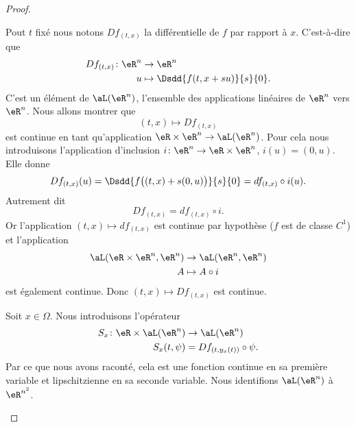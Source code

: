 \begin{proof}
	\begin{subproof}
		Pout \( t\) fixé nous notons \( Df_{(t,x)}\) la différentielle de \( f\) par rapport à \( x\). C'est-à-dire que
		\begin{equation}
			\begin{aligned}
				Df_{(t,x)}\colon \eR^n & \to \eR^n                         \\
				u                      & \mapsto \Dsdd{ f(t,x+su) }{s}{0}.
			\end{aligned}
		\end{equation}
		C'est un élément de \( \aL(\eR^n)\), l'ensemble des applications linéaires de \( \eR^n\) vers \( \eR^n\). Nous allons montrer que
		\begin{equation}
			(t,x)\mapsto Df_{(t,x)}
		\end{equation}
		est continue en tant qu'application \( \eR\times \eR^n\to\aL(\eR^n)\). Pour cela nous introduisons l'application d'inclusion \( i\colon \eR^n\to \eR\times \eR^n\), \( i(u)=(0,u)\). Elle donne
		\begin{equation}
			Df_{(t,x)}(u)=\Dsdd{ f\big( (t,x)+s(0,u) \big) }{s}{0}=df_{(t,x)}\circ i (u).
		\end{equation}
		Autrement dit
		\begin{equation}
			Df_{(t,x)}=df_{(t,x)}\circ i.
		\end{equation}
		Or l'application \( (t,x)\mapsto df_{(t,x)} \) est continue par hypothèse (\( f\) est de classe \( C^1\)) et l'application
		\begin{equation}        \label{EQooZTAPooCduWcl}
			\begin{aligned}
				\aL(\eR\times \eR^n,\eR^n) & \to \aL(\eR^n,\eR^n) \\
				A                          & \mapsto A\circ i
			\end{aligned}
		\end{equation}
		est également continue. Donc \( (t,x)\mapsto Df_{(t,x)}\) est continue.


		Soit \( x\in \Omega\). Nous introduisons l'opérateur
		\begin{equation}
			\begin{aligned}
				S_x\colon \eR\times \aL(\eR^n) & \to \aL(\eR^n)              \\
				S_x(t,\psi)                    & =Df_{(t,y_x(t))}\circ \psi.
			\end{aligned}
		\end{equation}
		Par ce que nous avons raconté, cela est une fonction continue en sa première variable et lipschitzienne en sa seconde variable. Nous identifions \( \aL(\eR^n)\) à \( \eR^{n^2}\).


\end{subproof}
\end{proof}

